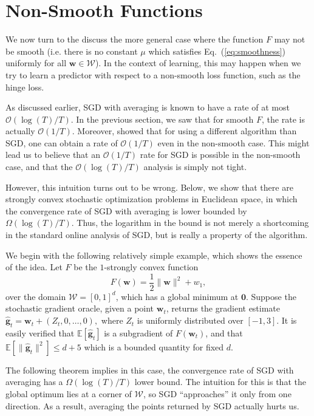 \documentclass{article}
\newcommand{\E}{\mathbb{E}}
\newcommand{\bw}{\mathbf{w}}
\newcommand{\bg}{\mathbf{g}}
\newcommand{\Ocal}{\mathcal{O}}
\newcommand{\Wcal}{\mathcal{W}}
\newcommand{\norm}[1]{\|#1\|}
\renewcommand{\eqref}[1]{Eq.~(\ref{#1})}
\begin{document}
\section{Non-Smooth Functions}\label{sec:nonsmooth}

We now turn to the discuss the more general case where the function $F$ may not be smooth (i.e. there is no constant $\mu$ which satisfies \eqref{eq:smoothness} uniformly for all $\bw\in\Wcal$). In the context of learning, this may happen when we try to learn a predictor with respect to a non-smooth loss function, such as the hinge loss.

As discussed earlier, SGD with averaging is known to have a rate of at most $\Ocal(\log(T)/T)$. In the previous section, we saw that for smooth $F$, the rate is actually $\Ocal(1/T)$. Moreover, \cite{HazanKa11} showed that for using a different algorithm than SGD, one can obtain a rate of $\Ocal(1/T)$ even in the non-smooth case. This might lead us to believe that an $\Ocal(1/T)$ rate for SGD is possible in the non-smooth case, and that the $\Ocal(\log(T)/T)$ analysis is simply not tight.

However, this intuition turns out to be wrong. Below, we show that there are strongly convex stochastic optimization problems in Euclidean space, in which the convergence rate of SGD with averaging is lower bounded by $\Omega(\log(T)/T)$. Thus, the logarithm in the bound is not merely a shortcoming in the standard online analysis of SGD, but is really a property of the algorithm.

We begin with the following relatively simple example, which shows the essence of the idea. Let $F$ be the $1$-strongly convex function
\[
F(\bw) = \frac{1}{2}\norm{\bw}^2+w_1,
\]
over the domain $\Wcal=[0,1]^d$, which has a global minimum at $\mathbf{0}$. Suppose the stochastic gradient oracle, given a point $\bw_t$, returns the gradient estimate
$
\hat{\bg}_t = \bw_t+(Z_t,0,\ldots,0),
$
where $Z_t$ is uniformly distributed over $[-1,3]$. It is easily verified that $\E[\hat{\bg}_t]$ is a subgradient of $F(\bw_t)$, and that $\E[\norm{\hat{\bg}_t}^2]\leq d+5$ which is a bounded quantity for fixed $d$.

The following theorem implies in this case, the convergence rate of SGD with averaging has a $\Omega(\log(T)/T)$ lower bound. The intuition for this is that the global optimum lies at a corner of $\Wcal$, so SGD ``approaches'' it only from one direction. As a result, averaging the points returned by SGD actually hurts us.
\end{document}
